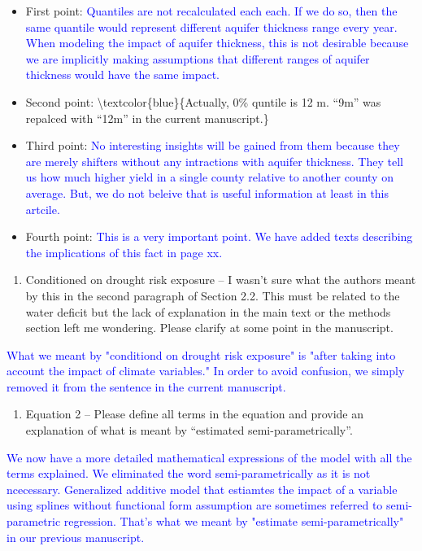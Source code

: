 \documentclass[
]{article}
\providecommand{\tightlist}{%
  \setlength{\itemsep}{0pt}\setlength{\parskip}{0pt}}
\begin{document}
\begin{itemize}
\tightlist
\item
  First point:
  \textcolor{blue}{Quantiles are not recalculated each each. If we do so, then the same quantile would represent different aquifer thickness range every year. When modeling the impact of aquifer thickness, this is not desirable because we are implicitly making assumptions that different ranges of aquifer thickness would have the same impact.}
\item
  Second point: \textbackslash textcolor\{blue\}\{Actually, 0\% quntile
  is 12 m. ``9m'' was repalced with ``12m'' in the current manuscript.\}
\item
  Third point:
  \textcolor{blue}{No interesting insights will be gained from them because they are merely shifters without any intractions with aquifer thickness. They tell us how much higher yield in a single county relative to another county on average. But, we do not beleive that is useful information at least in this artcile.}
\item
  Fourth point:
  \textcolor{blue}{This is a very important point. We have added texts describing the implications of this fact in page xx.}
\end{itemize}

\begin{enumerate}
\def\labelenumi{\arabic{enumi}.}
\setcounter{enumi}{2}
\tightlist
\item
  Conditioned on drought risk exposure -- I wasn't sure what the authors
  meant by this in the second paragraph of Section 2.2. This must be
  related to the water deficit but the lack of explanation in the main
  text or the methods section left me wondering. Please clarify at some
  point in the manuscript.
\end{enumerate}

\textcolor{blue}{What we meant by "conditiond on drought risk exposure" is "after taking into account the impact of climate variables." In order to avoid confusion, we simply removed it from the sentence in the current manuscript.}

\begin{enumerate}
\def\labelenumi{\arabic{enumi}.}
\setcounter{enumi}{3}
\tightlist
\item
  Equation 2 -- Please define all terms in the equation and provide an
  explanation of what is meant by ``estimated semi-parametrically''.
\end{enumerate}

\textcolor{blue}{We now have a more detailed mathematical expressions of the model with all the terms explained. We eliminated the word semi-parametrically as it is not ncecessary. Generalized additive model that estiamtes the impact of a variable using splines without functional form assumption are sometimes referred to semi-parametric regression. That's what we meant by "estimate semi-parametrically" in our previous manuscript.}
\end{document}
